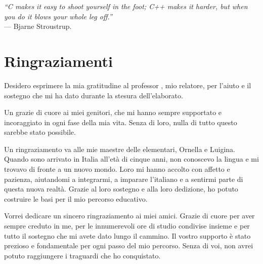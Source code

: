 \cleardoublepage
{}
{}

\begin{flushright}{
    \slshape
    ``C makes it easy to shoot yourself in the foot; C++ makes it harder, but when you do it blows your whole leg off.''} \\
    \medskip
    --- Bjarne Stroustrup.
\end{flushright}


\begingroup
\let\clearpage\relax
\let\cleardoublepage\relax
\let\cleardoublepage\relax

\chapter*{Ringraziamenti}

\noindent Desidero esprimere la mia gratitudine al professor \myProf, mio relatore, per l'aiuto e il sostegno che mi ha dato durante la stesura dell'elaborato.

\vspace{0.35cm}

\noindent Un grazie di cuore ai miei genitori, che mi hanno sempre supportato e incoraggiato in ogni fase della mia vita.
Senza di loro, nulla di tutto questo sarebbe stato possibile.

\vspace{0.35cm}

\noindent Un ringraziamento va alle mie maestre delle elementari, Ornella e Luigina.
Quando sono arrivato in Italia all'età di cinque anni, non conoscevo la lingua e mi trovavo di fronte a un nuovo mondo.
Loro mi hanno accolto con affetto e pazienza, aiutandomi a integrarmi, a imparare l'italiano e a sentirmi parte di questa nuova realtà.
Grazie al loro sostegno e alla loro dedizione, ho potuto costruire le basi per il mio percorso educativo.

\vspace{0.35cm}

Vorrei dedicare un sincero ringraziamento ai miei amici.
Grazie di cuore per aver sempre creduto in me, per le innumerevoli ore di studio condivise insieme e per tutto il sostegno che mi avete dato lungo il cammino.
Il vostro supporto è stato prezioso e fondamentale per ogni passo del mio percorso.
Senza di voi, non avrei potuto raggiungere i traguardi che ho conquistato.

\vspace{0.75cm}

\noindent{\myLocation, \myTime}
\hfill \textit{\myName}

\endgroup
